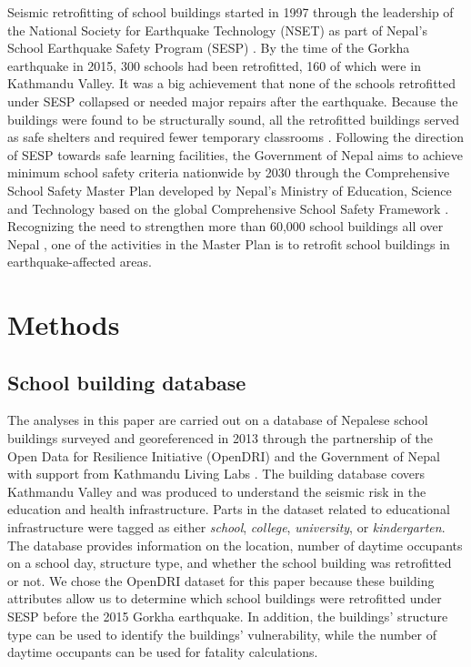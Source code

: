 Seismic retrofitting of school buildings started in 1997 through the leadership of the National Society for Earthquake Technology (NSET) as part of Nepal's School Earthquake Safety Program (SESP)  \citep{marasini_2019}. By the time of the Gorkha earthquake in 2015, 300 schools had been retrofitted, 160 of which were in Kathmandu Valley. It was a big achievement that none of the schools retrofitted under SESP collapsed or needed major repairs after the earthquake. Because the buildings were found to be structurally sound, all the retrofitted buildings served as safe shelters and required fewer temporary classrooms \citep{marasini_2019}. 
Following the direction of SESP towards safe learning facilities, the Government of Nepal aims to achieve minimum school safety criteria nationwide by 2030 through the Comprehensive School Safety Master Plan developed by Nepal's Ministry of Education, Science and Technology \citep{cehrdc2018} based on the global Comprehensive School Safety Framework \citep{unisdr2017}. Recognizing the need to strengthen more than 60,000 school buildings all over Nepal \citep{marasini2020}, one of the activities in the Master Plan is to retrofit school buildings in earthquake-affected areas.

\section{Methods}
\label{section-methods}

\subsection{School building database}
The analyses in this paper are carried out on a database of Nepalese school buildings surveyed and georeferenced in 2013 through the partnership of the Open Data for Resilience Initiative (OpenDRI) and the Government of Nepal with support from Kathmandu Living Labs \citep{opendri_2012}. The building database covers Kathmandu Valley and was produced to understand the seismic risk in the education and health infrastructure. Parts in the dataset related to educational infrastructure were tagged as either \textit{school}, \textit{college}, \textit{university}, or \textit{kindergarten}. The database provides information on the location, number of daytime occupants on a school day, structure type, and whether the school building was retrofitted or not. We chose the OpenDRI dataset for this paper because these building attributes allow us to determine which school buildings were retrofitted under SESP before the 2015 Gorkha earthquake. In addition, the buildings’ structure type can be used to identify the buildings’ vulnerability, while the number of daytime occupants can be used for fatality calculations.

